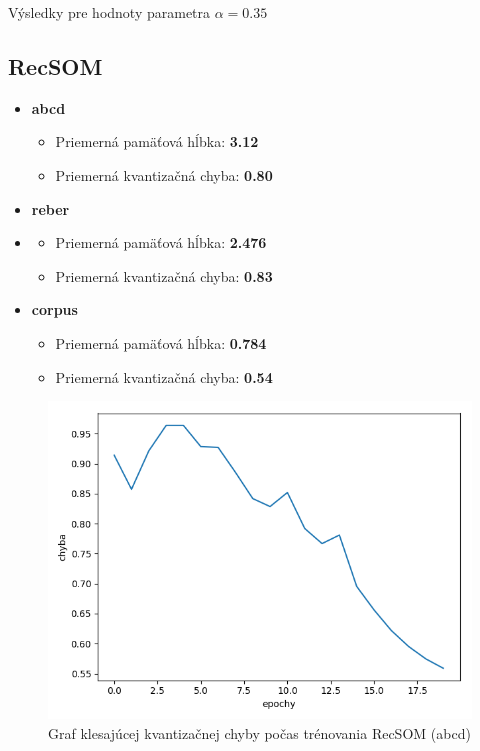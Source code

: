 Výsledky pre hodnoty parametra $\alpha = 0.35$
\subsection{RecSOM}
\begin{itemize}
    \item \textbf{abcd}
    \begin{itemize}
        \item Priemerná pamäťová hĺbka: \textbf{3.12}
        \item Priemerná kvantizačná chyba: \textbf{0.80}
    \end{itemize}
    \item \textbf{reber}
    \item \begin{itemize}
        \item Priemerná pamäťová hĺbka: \textbf{2.476}
        \item Priemerná kvantizačná chyba: \textbf{0.83}
    \end{itemize}
    \item \textbf{corpus}
    \begin{itemize}
        \item Priemerná pamäťová hĺbka: \textbf{0.784}
        \item Priemerná kvantizačná chyba: \textbf{0.54}
    \end{itemize}
\end{itemize}

\begin{figure}[H]
    \centering
    \includegraphics[width=\textwidth]{assets/r_error_top}
    \caption{Graf klesajúcej kvantizačnej chyby počas trénovania RecSOM (abcd)}
    \label{kvantizacna_chyba_recsom}

\end{figure}


